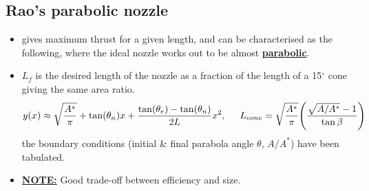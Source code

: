 \documentclass[a4paper,10pt]{article}
\begin{document}
\subsection{Rao's parabolic nozzle}
\begin{itemize}
    \item gives maximum thrust for a given length, and can be characterised as the following, where the ideal nozzle works out to be almost \underline{\textbf{parabolic}}. 
    \item $L_f$ is the desired length of the nozzle as a fraction of the length of a 15$^\circ$ cone giving the same area ratio.
    \begin{gather*}
        y(x)\approx\sqrt{\frac{A^*}{\pi}}+\tan(\theta_n)x+\frac{\tan(\theta_e)-\tan(\theta_n)}{2L}x^2,\hspace*{0.5cm}L_{cone} = \sqrt{\frac{A^*}{\pi}}\Bigg(\frac{\sqrt{A/A^*}-1}{\tan\beta}\Bigg)
    \end{gather*}
    the boundary conditions (initial \& final parabola angle $\theta$, $A/A^*$) have been tabulated.
    \item \underline{\textbf{NOTE:}} Good trade-off between efficiency and size. 
\end{itemize}
\end{document}
